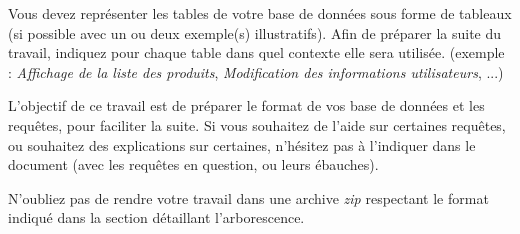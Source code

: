 

\vspace*{0.7cm}

\noindent {}

\bigskip

\noindent Vous devez représenter les tables de votre base de données sous forme de tableaux (si possible avec un ou deux exemple(s) illustratifs).
Afin de préparer la suite du travail, indiquez pour chaque table dans quel contexte elle sera utilisée.
(exemple : \textit{Affichage de la liste des produits}, \textit{Modification des informations utilisateurs}, ...)

\bigskip

\noindent L'objectif de ce travail est de préparer le format de vos base de données et les requêtes, pour faciliter la suite.
Si vous souhaitez de l'aide sur certaines requêtes, ou souhaitez des explications sur certaines, n'hésitez pas à l'indiquer dans le document (avec les requêtes en question, ou leurs ébauches).

\bigskip

\noindent N'oubliez pas de rendre votre travail dans une archive \textit{zip} respectant le format indiqué dans la section détaillant l'arborescence.
